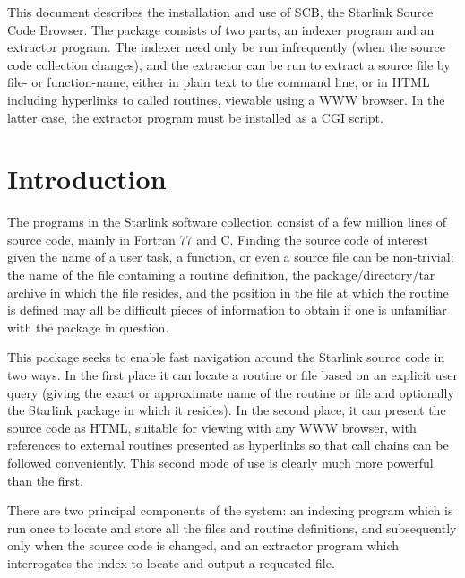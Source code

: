 \documentclass[twoside,11pt]{article}
\newcommand{\stardocinitials}  {SUN}
\newcommand{\stardocnumber}    {225.2}
\newcommand{\stardocabstract}  {
This document describes the installation and use of SCB, 
the Starlink Source Code Browser.  
The package consists of two parts, an indexer program and an
extractor program.
The indexer need only be run infrequently (when the source code collection
changes), and the extractor can be run to extract a source file
by file- or function-name, either in plain text to the command line,
or in HTML including hyperlinks to called routines, viewable
using a WWW browser.  In the latter case, the extractor program 
must be installed as a CGI script.
}
\newcommand{\stardocname}{\stardocinitials /\stardocnumber}
\newenvironment{latexonly}{}{}
\newcommand{\xlabel}[1]{}
\renewcommand{\_}{\texttt{\symbol{95}}}
\renewcommand{\thepage}{\roman{page}}
\begin{document}
\stardocabstract
  \newpage
  \begin{latexonly}
    \setlength{\parskip}{0mm}
    \tableofcontents
    \setlength{\parskip}{\medskipamount}
    \markboth{\stardocname}{\stardocname}
  \end{latexonly}
\cleardoublepage
\renewcommand{\thepage}{\arabic{page}}
\setcounter{page}{1}


\section{\xlabel{sec:introduction}\label{sec:introduction}Introduction}

The programs in the Starlink software collection 
consist of a few million lines of source code, mainly in 
Fortran 77 and C. 
Finding the source code of interest given the name of a
user task, a function, or even a source file can be non-trivial;
the name of the file containing a routine definition,
the package/directory/tar archive in which the file resides,
and the position in the file at which the routine is defined
may all be difficult pieces of information to obtain if one is
unfamiliar with the package in question.

This package seeks to enable fast navigation around the Starlink 
source code in two ways.  In the first place it can locate a routine
or file based on an explicit user query (giving the exact or
approximate name of the routine or file and optionally the Starlink 
package in which it resides).  In the second place, it can present
the source code as HTML, suitable for viewing with any WWW browser,
with references to external routines presented as hyperlinks so
that call chains can be followed conveniently.
This second mode of use is clearly much more powerful than the first.

There are two principal components of the system: an indexing program
which is run once to locate and store all the files and routine 
definitions, and subsequently only when the source code is changed,
and an extractor program which interrogates the index to locate 
and output a requested file.
\end{document}
